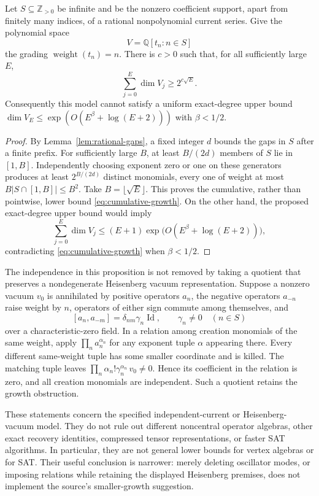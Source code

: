\begin{proposition}
\label{prop:oscillator-growth}
Let $S\subseteq\mathbb Z_{>0}$ be infinite and be the nonzero
coefficient support, apart from finitely many indices, of a rational
nonpolynomial current series.  Give the polynomial space
\[
 V=\mathbb Q[t_n:n\in S]
\]
the grading $\operatorname{weight}(t_n)=n$.  There is $c>0$ such that,
for all sufficiently large $E$,
\begin{equation}
 \sum_{j=0}^E\dim V_j\ge2^{c\sqrt E}.
 \label{eq:cumulative-growth}
\end{equation}
Consequently this model cannot satisfy a uniform exact-degree upper
bound $\dim V_E\le\exp(O(E^\beta+\log(E+2)))$ with $\beta<1/2$.
\end{proposition}
\begin{proof}
By Lemma~\ref{lem:rational-gaps}, a fixed integer $d$ bounds the gaps
in $S$ after a finite prefix.  For sufficiently large $B$, at least
$B/(2d)$ members of $S$ lie in $[1,B]$.  Independently choosing
exponent zero or one on these generators produces at least
$2^{B/(2d)}$ distinct monomials, every one of weight at most
$B|S\cap[1,B]|\le B^2$.  Take $B=\lfloor\sqrt E\rfloor$.
This proves the cumulative, rather than pointwise, lower bound
\eqref{eq:cumulative-growth}.  On the other hand, the proposed
exact-degree upper bound would imply
\[
 \sum_{j=0}^E\dim V_j
 \le (E+1)\exp\bigl(O(E^\beta+\log(E+2))\bigr),
\]
contradicting \eqref{eq:cumulative-growth} when $\beta<1/2$.
\end{proof}

The independence in this proposition is not removed by taking a
quotient that preserves a nondegenerate Heisenberg vacuum
representation.  Suppose a nonzero vacuum $v_0$ is annihilated by
positive operators $a_n$, the negative operators $a_{-n}$ raise weight
by $n$, operators of either sign commute among themselves, and
\[
 [a_n,a_{-m}]=\delta_{nm}\gamma_n\operatorname{Id},
 \qquad \gamma_n\ne0\quad(n\in S)
\]
over a characteristic-zero field.  In a relation among creation
monomials of the same weight, apply
$\prod_na_n^{\alpha_n}$ for any exponent tuple $\alpha$ appearing
there.  Every different same-weight tuple has some smaller coordinate
and is killed.  The matching tuple leaves
$\prod_n\alpha_n!\gamma_n^{\alpha_n}\,v_0\ne0$.
Hence its coefficient in the relation is zero, and all creation
monomials are independent.  Such a quotient retains the growth
obstruction.

These statements concern the specified independent-current or
Heisenberg-vacuum model.  They do not rule out different noncentral
operator algebras, other exact recovery identities, compressed tensor
representations, or faster SAT algorithms.  In particular, they are
not general lower bounds for vertex algebras or for SAT.  Their useful
conclusion is narrower: merely deleting oscillator modes, or imposing
relations while retaining the displayed Heisenberg premises, does not
implement the source's smaller-growth suggestion.

